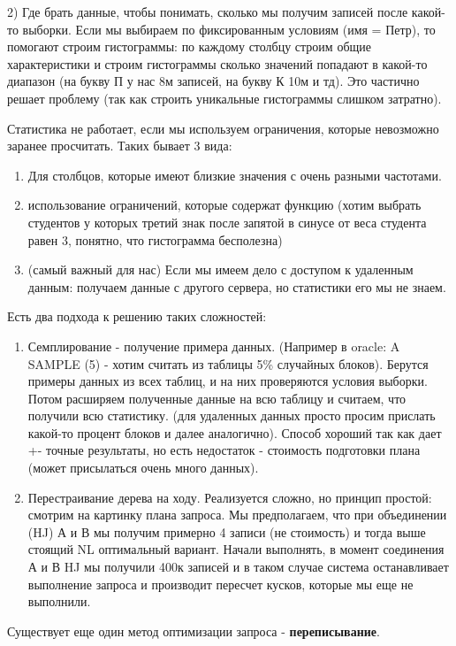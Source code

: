 2) Где брать данные, чтобы понимать, сколько мы получим записей после какой-то выборки. Если мы выбираем по фиксированным условиям (имя = Петр), то помогают строим гистограммы: по каждому столбцу строим общие характеристики и строим гистограммы сколько значений попадают в какой-то диапазон (на букву П у нас 8м записей, на букву К 10м и тд). Это частично решает проблему (так как строить уникальные гистограммы слишком затратно). 

Статистика не работает, если мы используем ограничения, которые невозможно заранее просчитать. Таких бывает 3 вида: 
\begin{enumerate}
	\item Для столбцов, которые имеют близкие значения с очень разными частотами.
	\item использование ограничений, которые содержат функцию (хотим выбрать студентов у которых третий знак после запятой в синусе от веса студента равен 3, понятно, что гистограмма бесполезна) 
	\item (самый важный для нас) Если мы имеем дело с доступом к удаленным данным: получаем данные с другого сервера, но статистики его мы не знаем.
\end{enumerate}

Есть два подхода к решению таких сложностей: 

\begin{enumerate}
	\item Семплирование - получение примера данных. (Например в oracle: A SAMPLE (5) - хотим считать из таблицы 5\% случайных блоков). Берутся примеры данных из всех таблиц, и на них проверяются условия выборки. Потом расширяем полученные данные на всю таблицу и считаем, что получили всю статистику. (для удаленных данных просто просим прислать какой-то процент блоков и далее аналогично). Способ хороший так как дает +- точные результаты, но есть недостаток - стоимость подготовки плана (может присылаться очень много данных).
	\item Перестраивание дерева на ходу. Реализуется сложно, но принцип простой:  смотрим на картинку плана запроса. Мы предполагаем, что при объединении (HJ) А и В мы получим примерно 4 записи (не стоимость) и тогда выше стоящий NL оптимальный вариант. Начали выполнять, в момент соединения А и В HJ мы получили 400к записей и в таком случае система останавливает выполнение запроса и производит пересчет кусков, которые мы еще не выполнили.
\end{enumerate}

Существует еще один метод оптимизации запроса - \textbf{переписывание}. 

